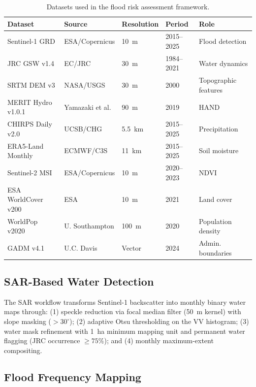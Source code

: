 \documentclass{article}
\begin{document}
\begin{table}[htbp]
\caption{Datasets used in the flood risk assessment framework.}
\label{tab:data_sources}
\centering
\footnotesize
\begin{tabular}{lllll}
\toprule
\textbf{Dataset} & \textbf{Source} & \textbf{Resolution} & \textbf{Period} & \textbf{Role} \\
\midrule
Sentinel-1 GRD & ESA/Copernicus & \SI{10}{\metre} & 2015--2025 & Flood detection \\
JRC GSW v1.4 & EC/JRC & \SI{30}{\metre} & 1984--2021 & Water dynamics \\
SRTM DEM v3 & NASA/USGS & \SI{30}{\metre} & 2000 & Topographic features \\
MERIT Hydro v1.0.1 & Yamazaki et al. & \SI{90}{\metre} & 2019 & HAND \\
CHIRPS Daily v2.0 & UCSB/CHG & \SI{5.5}{\kilo\metre} & 2015--2025 & Precipitation \\
ERA5-Land Monthly & ECMWF/C3S & \SI{11}{\kilo\metre} & 2015--2025 & Soil moisture \\
Sentinel-2 MSI & ESA/Copernicus & \SI{10}{\metre} & 2020--2023 & NDVI \\
ESA WorldCover v200 & ESA & \SI{10}{\metre} & 2021 & Land cover \\
WorldPop v2020 & U. Southampton & \SI{100}{\metre} & 2020 & Population density \\
GADM v4.1 & U.C. Davis & Vector & 2024 & Admin. boundaries \\
\bottomrule
\end{tabular}
\end{table}

\subsection{SAR-Based Water Detection}
\label{sec:sar_water}

The SAR workflow transforms Sentinel-1 backscatter into monthly binary water maps through: (1) speckle reduction via focal median filter (\SI{50}{\metre} kernel) with slope masking ($> 30^{\circ}$); (2) adaptive Otsu thresholding \citep{Otsu1979} on the VV histogram; (3) water mask refinement with \SI{1}{\hectare} minimum mapping unit and permanent water flagging (JRC occurrence $\geq 75\%$); and (4) monthly maximum-extent compositing.

\subsection{Flood Frequency Mapping}
\end{document}
